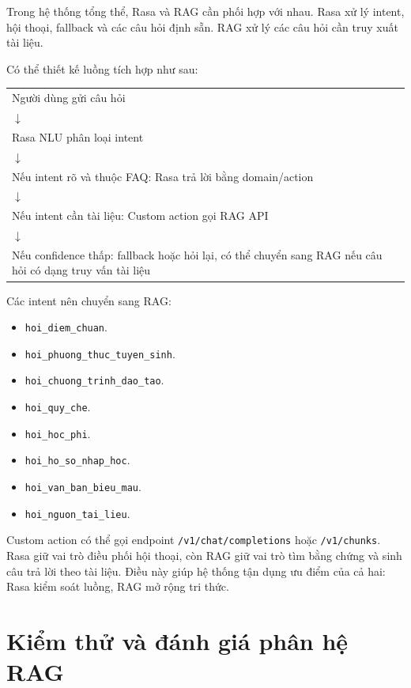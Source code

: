 Trong hệ thống tổng thể, Rasa và RAG cần phối hợp với nhau. Rasa xử lý intent, hội thoại, fallback và các câu hỏi định sẵn. RAG xử lý các câu hỏi cần truy xuất tài liệu.

Có thể thiết kế luồng tích hợp như sau:

\begin{center}
\begin{tabular}{p{12cm}}
Người dùng gửi câu hỏi \\
$\downarrow$ \\
Rasa NLU phân loại intent \\
$\downarrow$ \\
Nếu intent rõ và thuộc FAQ: Rasa trả lời bằng domain/action \\
$\downarrow$ \\
Nếu intent cần tài liệu: Custom action gọi RAG API \\
$\downarrow$ \\
Nếu confidence thấp: fallback hoặc hỏi lại, có thể chuyển sang RAG nếu câu hỏi có dạng truy vấn tài liệu
\end{tabular}
\end{center}

Các intent nên chuyển sang RAG:

\begin{itemize}
    \item \texttt{hoi\_diem\_chuan}.
    \item \texttt{hoi\_phuong\_thuc\_tuyen\_sinh}.
    \item \texttt{hoi\_chuong\_trinh\_dao\_tao}.
    \item \texttt{hoi\_quy\_che}.
    \item \texttt{hoi\_hoc\_phi}.
    \item \texttt{hoi\_ho\_so\_nhap\_hoc}.
    \item \texttt{hoi\_van\_ban\_bieu\_mau}.
    \item \texttt{hoi\_nguon\_tai\_lieu}.
\end{itemize}

Custom action có thể gọi endpoint \texttt{/v1/chat/completions} hoặc \texttt{/v1/chunks}. Rasa giữ vai trò điều phối hội thoại, còn RAG giữ vai trò tìm bằng chứng và sinh câu trả lời theo tài liệu. Điều này giúp hệ thống tận dụng ưu điểm của cả hai: Rasa kiểm soát luồng, RAG mở rộng tri thức.

\section{Kiểm thử và đánh giá phân hệ RAG}

